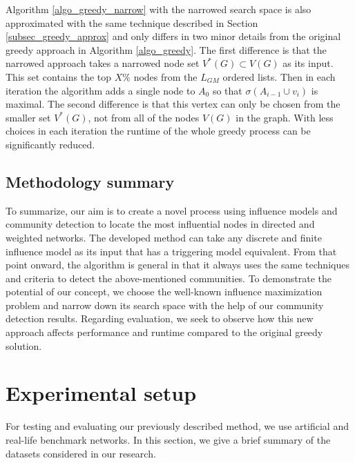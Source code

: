 \documentclass[pdflatex,sn-mathphys-num]{sn-jnl}
\begin{document}
Algorithm \ref{algo_greedy_narrow} with the narrowed search space is also approximated with the same technique described in Section \ref{subsec_greedy_approx} and only differs in two minor details from the original greedy approach in Algorithm \ref{algo_greedy}. The first difference is that the narrowed approach takes a narrowed node set $V^*(G) \subset V(G)$ as its input. This set contains the top $X\%$ nodes from the $L_{GM}$ ordered lists. Then in each iteration the algorithm adds a single node to $A_{0}$ so that $\sigma(A_{i-1} \cup {v_i})$ is maximal. The second difference is that this vertex can only be chosen from the smaller set $V^*(G)$, not from all of the nodes $V(G)$ in the graph. With less choices in each iteration the runtime of the whole greedy process can be significantly reduced.


\subsection{Methodology summary}\label{subsec_method_summ}

To summarize, our aim is to create a novel process using influence models and community detection to locate the most influential nodes in directed and weighted networks. The developed method can take any discrete and finite influence model as its input that has a triggering model equivalent. From that point onward, the algorithm is general in that it always uses the same techniques and criteria to detect the above-mentioned communities. To demonstrate the potential of our concept, we choose the well-known influence maximization problem and narrow down its search space with the help of our community detection results. Regarding evaluation, we seek to observe how this new approach affects performance and runtime compared to the original greedy solution.


\section{Experimental setup}\label{sec_setup}

For testing and evaluating our previously described method, we use artificial and real-life benchmark networks. In this section, we give a brief summary of the datasets considered in our research.
\end{document}
